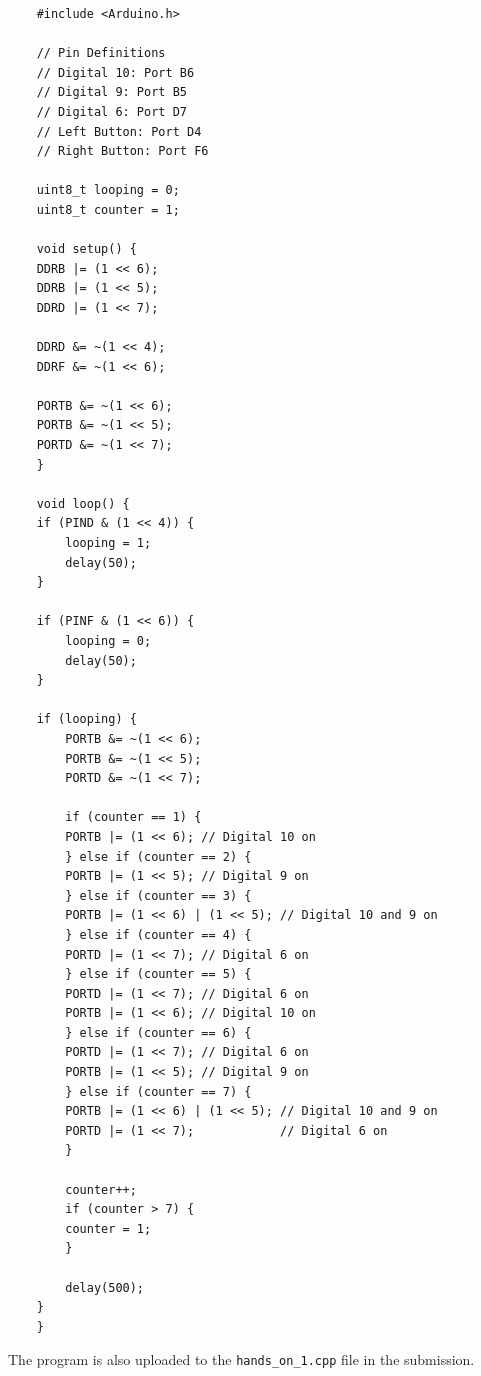 \documentclass{article}
\begin{document}
\begin{verbatim}
    #include <Arduino.h>

    // Pin Definitions
    // Digital 10: Port B6
    // Digital 9: Port B5
    // Digital 6: Port D7
    // Left Button: Port D4
    // Right Button: Port F6

    uint8_t looping = 0;
    uint8_t counter = 1;

    void setup() {
    DDRB |= (1 << 6);
    DDRB |= (1 << 5);
    DDRD |= (1 << 7);

    DDRD &= ~(1 << 4);
    DDRF &= ~(1 << 6);

    PORTB &= ~(1 << 6);
    PORTB &= ~(1 << 5);
    PORTD &= ~(1 << 7);
    }

    void loop() {
    if (PIND & (1 << 4)) {
        looping = 1;
        delay(50);
    }

    if (PINF & (1 << 6)) {
        looping = 0;
        delay(50);
    }

    if (looping) {
        PORTB &= ~(1 << 6);
        PORTB &= ~(1 << 5);
        PORTD &= ~(1 << 7);

        if (counter == 1) {
        PORTB |= (1 << 6); // Digital 10 on
        } else if (counter == 2) {
        PORTB |= (1 << 5); // Digital 9 on
        } else if (counter == 3) {
        PORTB |= (1 << 6) | (1 << 5); // Digital 10 and 9 on
        } else if (counter == 4) {
        PORTD |= (1 << 7); // Digital 6 on
        } else if (counter == 5) {
        PORTD |= (1 << 7); // Digital 6 on
        PORTB |= (1 << 6); // Digital 10 on
        } else if (counter == 6) {
        PORTD |= (1 << 7); // Digital 6 on
        PORTB |= (1 << 5); // Digital 9 on
        } else if (counter == 7) {
        PORTB |= (1 << 6) | (1 << 5); // Digital 10 and 9 on
        PORTD |= (1 << 7);            // Digital 6 on
        }

        counter++;
        if (counter > 7) {
        counter = 1;
        }

        delay(500);
    }
    }
\end{verbatim}
The program is also uploaded to the \texttt{hands\_on\_1.cpp} file in the submission. 
\end{document}
